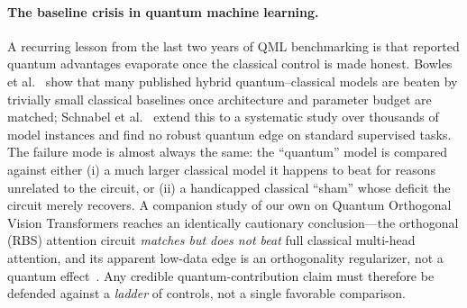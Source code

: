 \documentclass[10pt,letterpaper]{article}
\theoremstyle{plain}
\theoremstyle{definition}
\begin{document}
\paragraph{The baseline crisis in quantum machine learning.}
A recurring lesson from the last two years of QML benchmarking is that reported
quantum advantages evaporate once the classical control is made honest.
Bowles et al.~\cite{bowles2024} show that many published hybrid quantum--classical
models are beaten by trivially small classical baselines once architecture and
parameter budget are matched; Schnabel et al.~\cite{schnabel2025} extend this to
a systematic study over thousands of model instances and find no robust quantum
edge on standard supervised tasks.
The failure mode is almost always the same: the ``quantum'' model is compared
against either (i) a much larger classical model it happens to beat for reasons
unrelated to the circuit, or (ii) a handicapped classical ``sham'' whose deficit
the circuit merely recovers.
A companion study of our own on Quantum Orthogonal Vision Transformers reaches an
identically cautionary conclusion---the orthogonal (RBS) attention circuit
\emph{matches but does not beat} full classical multi-head attention, and its
apparent low-data edge is an orthogonality regularizer, not a quantum
effect~\cite{qovt_companion,cherrat2022}.
Any credible quantum-contribution claim must therefore be defended against a
\emph{ladder} of controls, not a single favorable comparison.
\end{document}
